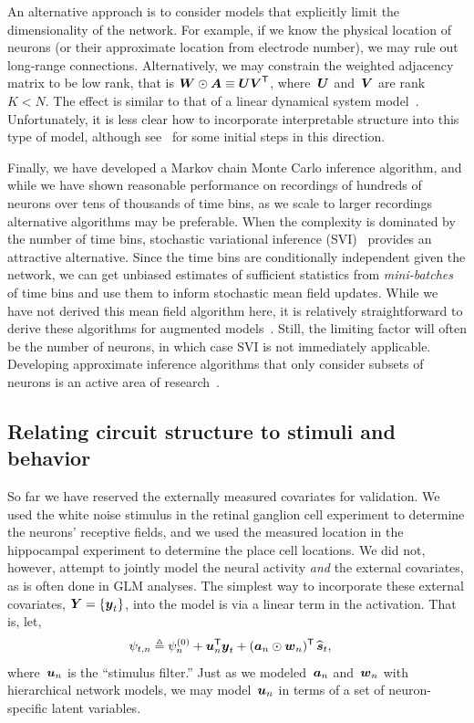 \sloppy
An alternative approach is to consider models that explicitly limit 
the dimensionality of the network. For example, if we know the 
physical location of neurons (or their approximate location from 
electrode number), we may rule out long-range connections. 
Alternatively, we may constrain the weighted adjacency matrix to be 
low rank, that is ${\boldsymbol{W} \odot \boldsymbol{A} \equiv \boldsymbol{U} \boldsymbol{V}^{\mathsf{T}}}$, where~$\boldsymbol{U}$
and~$\boldsymbol{V}$ are rank~${K < N}$. The effect is similar to that of 
a linear dynamical system model~\citep{paninski2010new, macke2011empirical}. 
Unfortunately, it is less clear how to incorporate interpretable 
structure into this type of model, although see~\citet{buesing2014clustered}
for some initial steps in this direction.


Finally, we have developed a Markov chain Monte Carlo inference algorithm,
and while we have shown reasonable performance on recordings of 
hundreds of neurons over tens of thousands of time bins, as we scale 
to larger recordings alternative algorithms may be preferable. 
When the complexity is dominated by the number of time bins, 
stochastic variational inference (SVI)~\citep{Hoffman-2013} provides 
an attractive alternative. Since the time bins are conditionally 
independent given the network, we can get unbiased estimates of 
sufficient statistics from \textit{mini-batches} of time bins
and use them to inform stochastic mean field updates. 
While we have not derived this mean field algorithm here, it is 
relatively straightforward to derive these algorithms for 
\polyagamma augmented models~\citep{Pillow2012, Zhou2012}. 
Still, the limiting factor will often be the number of neurons, 
in which case SVI is not immediately applicable. Developing 
approximate inference algorithms that only consider subsets of neurons is 
an active area of research~\citep{soudry2015efficient}. 

\subsection{Relating circuit structure to stimuli and behavior}
So far we have reserved the externally measured covariates for
validation.  We used the white noise stimulus in the retinal ganglion
cell experiment to determine the neurons' receptive fields, and we
used the measured location in the hippocampal experiment to determine
the place cell locations. We did not, however, attempt to jointly
model the neural activity \emph{and} the external covariates, as is
often done in GLM analyses. The simplest way to incorporate these external covariates,
${\boldsymbol{Y} = \{\boldsymbol{y}_t\}}$, into the model is via a linear term in the
activation. That is, let,
\begin{align*}
  \psi_{t,n} &\triangleq \psi_n^{(0)}  +
  \boldsymbol{u}_n^{\mathsf{T}} \boldsymbol{y}_t + (\boldsymbol{a}_{n} \odot \boldsymbol{w}_n)^{\mathsf{T}} \, \widehat{\boldsymbol{s}}_t,
\end{align*}
where~$\boldsymbol{u}_n$ is the ``stimulus filter.''
Just as we modeled~$\boldsymbol{a}_n$ and~$\boldsymbol{w}_n$ with hierarchical network models,
we may model~$\boldsymbol{u}_n$ in terms of a set of neuron-specific latent variables.

